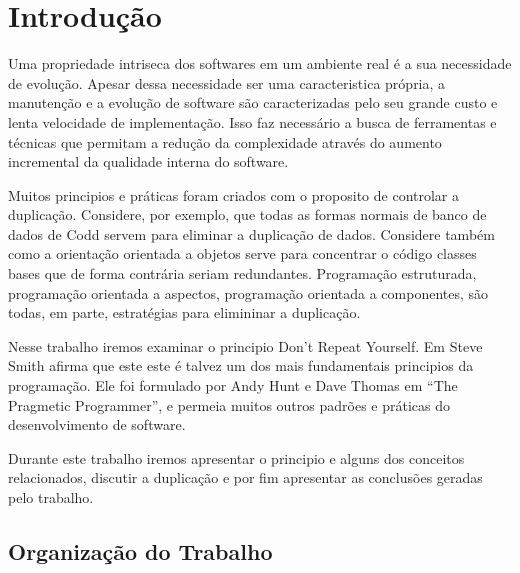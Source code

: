 \chapter{Introdução}

Uma propriedade intriseca dos softwares em um ambiente real é a sua necessidade
de evolução\cite{survey}. Apesar dessa necessidade ser uma caracteristica
própria, a manutenção e a evolução de software são caracterizadas pelo seu
grande custo e lenta velocidade de implementação\cite{maintenance}. Isso faz
necessário a busca de ferramentas e técnicas que permitam a redução da
complexidade através do aumento incremental da qualidade interna do
software\cite{survey}.

Muitos principios e práticas foram criados com o proposito de controlar a
duplicação. Considere, por exemplo, que todas as formas normais de banco de
dados de Codd servem para eliminar a duplicação de dados. Considere também como
a orientação orientada a objetos serve para concentrar o código classes bases
que de forma contrária seriam redundantes. Programação estruturada, programação
orientada a aspectos, programação orientada a componentes, são todas, em parte,
estratégias para elimininar a duplicação\cite{clean2009}.

Nesse trabalho iremos examinar o principio Don't Repeat Yourself. Em
\cite{97things2010} Steve Smith afirma que este este é talvez um dos mais
fundamentais principios da programação. Ele foi formulado por Andy Hunt e Dave
Thomas em ``The Pragmetic Programmer'', e permeia muitos outros padrões e
práticas do desenvolvimento de software\cite{97things2010}.

Durante este trabalho iremos apresentar o principio e alguns dos conceitos
relacionados, discutir a duplicação e por fim apresentar as conclusões geradas
pelo trabalho.

\section{Organização do Trabalho}